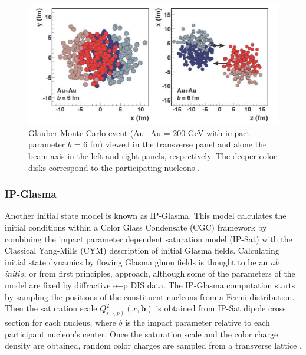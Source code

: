 \begin{figure}[h!]
\begin{center}
\includegraphics[width=0.65\linewidth]{figs/glauber_auau_example.png}
\caption{Glauber Monte Carlo event (Au+Au \sqsn = 200 GeV with impact parameter $b$ = 6 fm) viewed in the transverse panel and alone the beam axis in the left and right panels, respectively. The deeper color disks correspond to the participating nucleons \cite{annurev.nucl.57.090506.123020}.}
\label{fig:glauberauauexample}
\end{center}
\end{figure}



\subsubsection{IP-Glasma}
Another initial state model is known as IP-Glasma. This model calculates the initial conditions within a Color Glass Condensate (CGC) framework by combining the impact parameter dependent saturation model (IP-Sat) with the Classical Yang-Mills (CYM) description of initial Glasma fields. Calculating initial state dynamics by flowing Glasma gluon fields is thought to be an \textit{ab initio}, or from first principles, approach, although some of the parameters of the model are fixed by diffractive e+p DIS data. The IP-Glasma computation starts by sampling the positions of the constituent nucleons from a Fermi distribution. Then the saturation scale $Q^2_{s,(p)}(x,\textbf{b})$ is obtained from IP-Sat dipole cross section for each nucleus, where $b$ is the impact parameter relative to each participant nucleon's center. Once the saturation scale and the color charge density are obtained, random color charges are sampled from a transverse lattice \cite{PhysRevLett.108.252301}.

